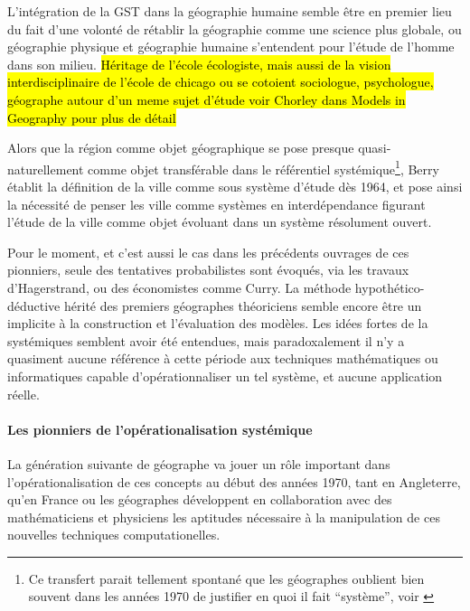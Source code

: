 L'intégration de la GST dans la géographie humaine semble être en premier lieu du fait d'une volonté de rétablir la géographie comme une science plus globale, ou géographie physique et géographie humaine s'entendent pour l'étude de l'homme dans son milieu. \hl{Héritage de l'école écologiste, mais aussi de la vision interdisciplinaire de l'école de chicago ou se cotoient sociologue, psychologue, géographe autour d'un meme sujet d'étude voir Chorley dans Models in Geography pour plus de détail}

Alors que la région comme objet géographique se pose presque quasi-naturellement comme objet transférable dans le référentiel systémique\footnote{Ce transfert parait tellement spontané que les géographes oublient bien souvent dans les années 1970 de justifier en quoi il fait \enquote{système}, voir \autocite{Orain2001}}, Berry établit la définition de la ville comme sous système d'étude dès 1964, et pose ainsi la nécessité de penser les ville comme systèmes en interdépendance figurant l'étude de la ville comme objet évoluant dans un système résolument ouvert. 

Pour le moment, et c'est aussi le cas dans les précédents ouvrages de ces pionniers, seule des tentatives probabilistes sont évoqués, via les travaux d'Hagerstrand, ou des économistes comme Curry. La méthode hypothético-déductive hérité des premiers géographes théoriciens semble encore être un implicite à la construction et l'évaluation des modèles. Les idées fortes de la systémiques semblent avoir été entendues, mais paradoxalement il n'y a quasiment aucune référence à cette période aux techniques mathématiques ou informatiques capable d’opérationnaliser un tel système, et aucune application réelle. \autocite[467-468]{Harvey1969}

\paragraph{Les pionniers de l'opérationalisation systémique}

La génération suivante de géographe va jouer un rôle important dans l'opérationalisation de ces concepts au début des années 1970, tant en Angleterre, qu'en France ou les géographes développent en collaboration avec des mathématiciens et physiciens les aptitudes nécessaire à la manipulation de ces nouvelles techniques computationelles. \autocite{Pumain2002} 

